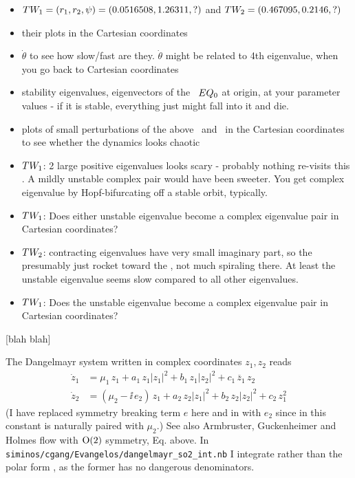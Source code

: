 \documentclass[aip,cha,reprint,
secnumarabic,
nofootinbib, tightenlines,
nobibnotes, showkeys, showpacs,
groupedaddress
]{revtex4-1}
\begin{document}
\begin{itemize}
  \item $TW_{1} = (r_1,r_2,\psi)=(0.0516508, 1.26311,?)$ and
        $TW_{2} = (0.467095,0.2146,?)$
  \item their plots in the Cartesian coordinates
  \item $\dot{\theta}$ to see how slow/fast are they. $\dot{\theta}$
        might be related to 4th eigenvalue, when you go back
        to Cartesian coordinates
  \item stability eigenvalues, eigenvectors of the \eqv\ $EQ_{0}$ at
        origin, at your parameter values - if it is stable, everything
        just might fall into it and die.
  \item plots of small perturbations of the above \eqv\ and \reqva\ in
        the Cartesian coordinates to see whether the dynamics looks
        chaotic
  \item $TW_{1}$: 2 large positive eigenvalues looks scary - probably
        nothing re-visits this \reqv. A mildly unstable complex pair
        would have been sweeter. You get complex eigenvalue by Hopf-bifurcating off a
        stable orbit, typically.
  \item $TW_{1}$: Does either unstable eigenvalue become a complex
        eigenvalue pair in Cartesian coordinates?
  \item $TW_{2}$: contracting eigenvalues have very small imaginary
        part, so the presumably just rocket toward the \reqv, not much
        spiraling there. At least the unstable eigenvalue seems slow
        compared to all other eigenvalues.
  \item $TW_{1}$: Does the unstable eigenvalue become a complex
        eigenvalue pair in Cartesian coordinates?
\end{itemize}

 [blah blah]

The Dangelmayr system written in complex
coordinates $z_1,z_2$ reads
\begin{subequations}\label{eq:2modesDangSO2}
\begin{align}
  \dot{z}_1 &= \mu_1\,z_1+a_1\,z_1|z_1|^2+b_1\,z_1|z_2|^2+c_1\,\overline{z}_1\,z_2\,\\
  \dot{z}_2 &= (\mu_2-\ii\, e_2)\,z_1+a_2\,z_2|z_1|^2+b_2\,z_2|z_2|^2+c_2\,z_1^2
\end{align}
\end{subequations}
(I have replaced symmetry breaking term $e$ here and in 
with $e_2$ since in this constant is naturally paired with $\mu_2$.)
See also Armbruster, Guckenheimer and Holmes flow with
$\textrm{O}(2)$ symmetry, Eq.  above.
In \texttt{siminos/cgang/Evangelos/dangelmayr\_so2\_int.nb}
I integrate  rather than the polar form ,
as the former has no dangerous denominators.
\end{document}
